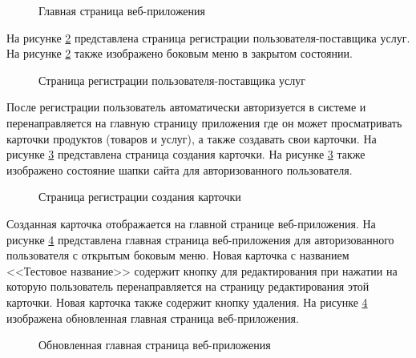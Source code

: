 \begin{figure}[H] %
\caption{Главная страница веб-приложения}
\label{test-front1:image}
\end{figure}

На рисунке \ref{test-front2:image} представлена страница регистрации пользователя-поставщика услуг. На рисунке \ref{test-front2:image} также изображено боковым меню в закрытом состоянии.

\newpage %
\begin{figure}[H] %
\caption{Страница регистрации пользователя-поставщика услуг}
\label{test-front2:image}
\end{figure}

После регистрации пользователь автоматически авторизуется в системе и перенаправляется на главную страницу приложения где он может просматривать карточки продуктов (товаров и услуг), а также создавать свои карточки. На рисунке \ref{test-front3:image} представлена страница создания карточки. На рисунке \ref{test-front3:image} также изображено состояние шапки сайта для авторизованного пользователя.

\newpage %
\begin{figure}[H] %
\caption{Страница регистрации создания карточки}
\label{test-front3:image}
\end{figure}

Созданная карточка отображается на главной странице веб-приложения. На рисунке \ref{test-front4:image} представлена главная страница веб-приложения для авторизованного пользователя с открытым боковым меню. Новая карточка с названием <<Тестовое название>> содержит кнопку для редактирования при нажатии на которую пользователь перенаправляется на страницу редактирования этой карточки. Новая карточка также содержит кнопку удаления. На рисунке \ref{test-front4:image} изображена обновленная главная страница веб-приложения.

\newpage %
\begin{figure}[H] %
\caption{Обновленная главная страница веб-приложения}
\label{test-front4:image}
\end{figure}

